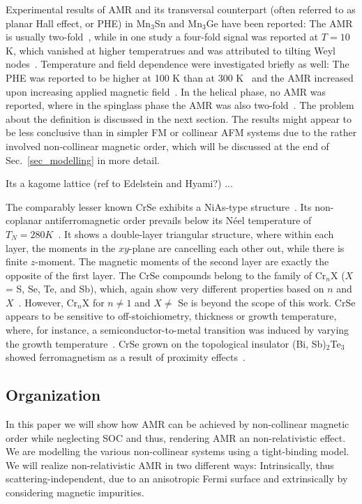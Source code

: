 \documentclass[prb,showpacs,amsmath,amssymb,superscriptaddress,twocolumn,floatfix]{revtex4-1}
\begin{document}
Experimental results of AMR and its transversal counterpart (often referred to as planar Hall effect, or PHE) in Mn$_3$Sn and Mn$_3$Ge have been reported: The AMR is usually two-fold~\cite{Sharma:2023, Chen:2021,Wu:2023}, while in one study a four-fold signal was reported at $ T = 10$ K, which vanished at higher temperatrues and was attributed to tilting Weyl nodes~\cite{Wu:2023}. Temperature and field dependence were investigated briefly as well: The PHE was reported to be higher at 100 K than at 300 K~\cite{Chen:2021} and the AMR increased upon increasing applied magnetic field~\cite{Sharma:2023}. In the helical phase, no AMR was reported, where in the spinglass phase the AMR was also two-fold~\cite{Sharma:2023}. The problem about the definition is discussed in the next section. The results might appear to be less conclusive than in simpler FM or collinear AFM systems due to the rather involved non-collinear magnetic order, which will be discussed at the end of Sec.~\ref{sec_modelling} in more detail.


{\color{red} Its a kagome lattice (ref to Edelstein and Hyami?) ... }


The comparably lesser known CrSe exhibits a NiAs-type structure~\cite{Corliss:1961}. Its non-coplanar antiferromagnetic order prevails below its N\'eel temperature of $T_N = 280K$~\cite{Tajima:2024, Polesya:2010}. It shows a double-layer triangular structure, where within each layer, the moments in the $xy$-plane are cancelling each other out, while there is finite $z$-moment. The magnetic moments of the second layer are exactly the opposite of the first layer. The CrSe compounds belong to the family of Cr$_n$X ($X$ = S, Se, Te, and Sb), which, again show very different properties based on $n$ and $X$~\cite{Tajima:2024, Polesya:2010}. However, Cr$_n$X for $n \neq 1$ and $X \neq$ Se is beyond the scope of this work. CrSe appears to be sensitive to off-stoichiometry, thickness or growth temperature, where, for instance, a semiconductor-to-metal transition was induced by varying the growth temperature~\cite{Tajima:2024}. CrSe grown on the topological insulator (Bi, Sb)$_2$Te$_3$ showed ferromagnetism as a result of proximity effects~\cite{Yang:2020}.

\subsection{Organization}

In this paper we will show how AMR can be achieved by non-collinear magnetic order while neglecting SOC and thus, rendering AMR an non-relativistic effect. We are modelling the various non-collinear systems using a tight-binding model. We will realize non-relativistic AMR in two different ways: Intrinsically, thus scattering-independent, due to an anisotropic Fermi surface and extrinsically by considering magnetic impurities.  
\end{document}
